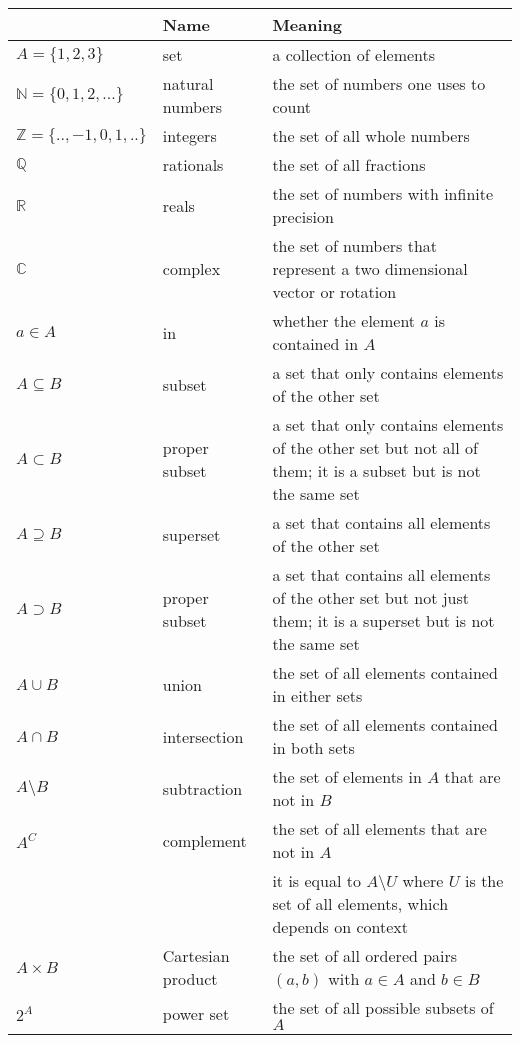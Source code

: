 \documentclass[11pt,letterpaper,fleqn]{memoir} %
\begin{document}
\begin{tabular}{p{} p{} p{}}
	& Name & Meaning  \\ 
	\hline 
	$A = \{1,2,3\}$ & set & a collection of elements\\ 
	\hline 
	$\mathbb{N} = \{0, 1, 2, ...\}$ & natural numbers & the set of numbers one uses to count \\ 
	\hline 
	$\mathbb{Z} = \{.., -1, 0, 1, ..\}$ & integers & the set of all whole numbers \\ 
	\hline 
	$\mathbb{Q}$ & rationals & the set of all fractions \\ 
	\hline 
	$\mathbb{R}$ & reals & the set of numbers with infinite precision \\ 
	\hline 
	$\mathbb{C}$ & complex & the set of numbers that represent a two dimensional vector or rotation \\ 
	\hline 
	$a \in A$ & in & whether the element $a$ is contained in $A$ \\ 
	\hline 
	$A \subseteq B$ & subset & a set that only contains elements of the other set\\ 
	\hline 
	$A \subset B$ & proper subset & a set that only contains elements of the other set but not all of them; it is a subset but is not the same set\\ 
	\hline 
	$A \supseteq B$ & superset & a set that contains all elements of the other set\\ 
	\hline 
	$A \supset B$ & proper subset & a set that contains all elements of the other set but not just them; it is a superset but is not the same set\\ 
	\hline 
	$A \cup B$ & union & the set of all elements contained in either sets\\ 
	\hline 
	$A \cap B$ & intersection & the set of all elements contained in both sets \\ 
	\hline 
	$A \setminus B$ & subtraction & the set of elements in $A$ that are not in $B$  \\ 
	\hline 
	$A^C$& complement & the set of all elements that are not in $A$ \\ 
	& & it is equal to $A \setminus U$ where $U$ is the set of all elements, which depends on context \\ 
	\hline 
	$A \times B$ & Cartesian product & the set of all ordered pairs $(a, b)$ with $a \in A$ and $b \in B$  \\ 
	\hline 
	$2^A$ & power set & the set of all possible subsets of $A$  \\ 
	\hline 
\end{tabular} 
\end{document}
